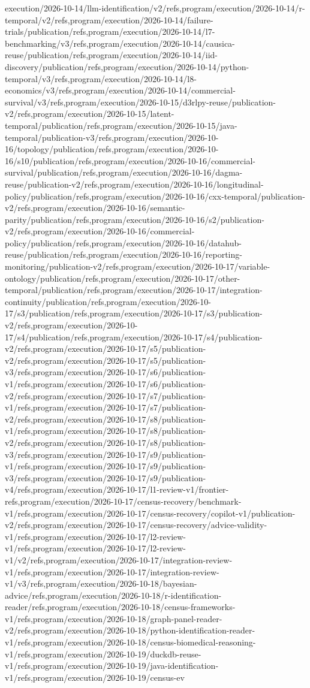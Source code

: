 \documentclass[11pt,a4paper,openany]{book}
\begin{document}
execution/2026-10-14/llm-identification/v2/refs,program/execution/2026-10-14/r-temporal/v2/refs,program/execution/2026-10-14/failure-trials/publication/refs,program/execution/2026-10-14/l7-benchmarking/v3/refs,program/execution/2026-10-14/causica-reuse/publication/refs,program/execution/2026-10-14/iid-discovery/publication/refs,program/execution/2026-10-14/python-temporal/v3/refs,program/execution/2026-10-14/l8-economics/v3/refs,program/execution/2026-10-14/commercial-survival/v3/refs,program/execution/2026-10-15/d3rlpy-reuse/publication-v2/refs,program/execution/2026-10-15/latent-temporal/publication/refs,program/execution/2026-10-15/java-temporal/publication-v3/refs,program/execution/2026-10-16/topology/publication/refs,program/execution/2026-10-16/s10/publication/refs,program/execution/2026-10-16/commercial-survival/publication/refs,program/execution/2026-10-16/dagma-reuse/publication-v2/refs,program/execution/2026-10-16/longitudinal-policy/publication/refs,program/execution/2026-10-16/cxx-temporal/publication-v2/refs,program/execution/2026-10-16/semantic-parity/publication/refs,program/execution/2026-10-16/s2/publication-v2/refs,program/execution/2026-10-16/commercial-policy/publication/refs,program/execution/2026-10-16/datahub-reuse/publication/refs,program/execution/2026-10-16/reporting-monitoring/publication-v2/refs,program/execution/2026-10-17/variable-ontology/publication/refs,program/execution/2026-10-17/other-temporal/publication/refs,program/execution/2026-10-17/integration-continuity/publication/refs,program/execution/2026-10-17/s3/publication/refs,program/execution/2026-10-17/s3/publication-v2/refs,program/execution/2026-10-17/s4/publication/refs,program/execution/2026-10-17/s4/publication-v2/refs,program/execution/2026-10-17/s5/publication-v2/refs,program/execution/2026-10-17/s5/publication-v3/refs,program/execution/2026-10-17/s6/publication-v1/refs,program/execution/2026-10-17/s6/publication-v2/refs,program/execution/2026-10-17/s7/publication-v1/refs,program/execution/2026-10-17/s7/publication-v2/refs,program/execution/2026-10-17/s8/publication-v1/refs,program/execution/2026-10-17/s8/publication-v2/refs,program/execution/2026-10-17/s8/publication-v3/refs,program/execution/2026-10-17/s9/publication-v1/refs,program/execution/2026-10-17/s9/publication-v3/refs,program/execution/2026-10-17/s9/publication-v4/refs,program/execution/2026-10-17/l1-review-v1/frontier-refs,program/execution/2026-10-17/census-recovery/benchmark-v1/refs,program/execution/2026-10-17/census-recovery/copilot-v1/publication-v2/refs,program/execution/2026-10-17/census-recovery/advice-validity-v1/refs,program/execution/2026-10-17/l2-review-v1/refs,program/execution/2026-10-17/l2-review-v1/v2/refs,program/execution/2026-10-17/integration-review-v1/refs,program/execution/2026-10-17/integration-review-v1/v3/refs,program/execution/2026-10-18/bayesian-advice/refs,program/execution/2026-10-18/r-identification-reader/refs,program/execution/2026-10-18/census-frameworks-v1/refs,program/execution/2026-10-18/graph-panel-reader-v2/refs,program/execution/2026-10-18/python-identification-reader-v1/refs,program/execution/2026-10-18/census-biomedical-reasoning-v1/refs,program/execution/2026-10-19/duckdb-reuse-v1/refs,program/execution/2026-10-19/java-identification-v1/refs,program/execution/2026-10-19/census-ev
\end{document}
